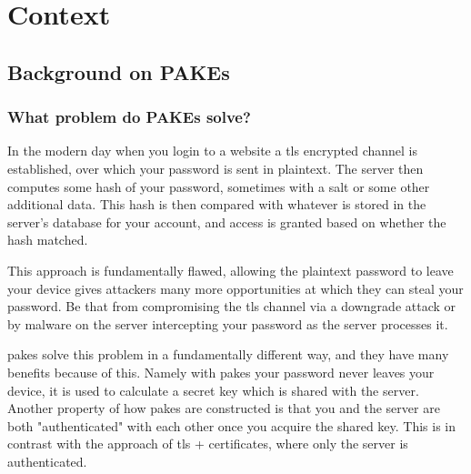 \chapter{Context}
\label{chap:context}

\section{Background on PAKEs}
\subsection{What problem do PAKEs solve?}
In the modern day when you login to a website a \gls{tls} encrypted channel is established, over which your password is sent in plaintext.
The server then computes some hash of your password, sometimes with a salt or some other additional data.
This hash is then compared with whatever is stored in the server's database for your account, and access is granted based on whether the hash matched.

This approach is fundamentally flawed, allowing the plaintext password to leave your device gives attackers many more opportunities at which they can steal your password.
Be that from compromising the \gls{tls} channel via a downgrade attack or by malware on the server intercepting your password as the server processes it.

\glspl{pake} solve this problem in a fundamentally different way, and they have many benefits because of this.
Namely with \glspl{pake} your password never leaves your device, it is used to calculate a secret key which is shared with the server.
Another property of how \glspl{pake} are constructed is that you and the server are both "authenticated" with each other once you acquire the shared key.
This is in contrast with the approach of \gls{tls} + certificates, where only the server is authenticated.

